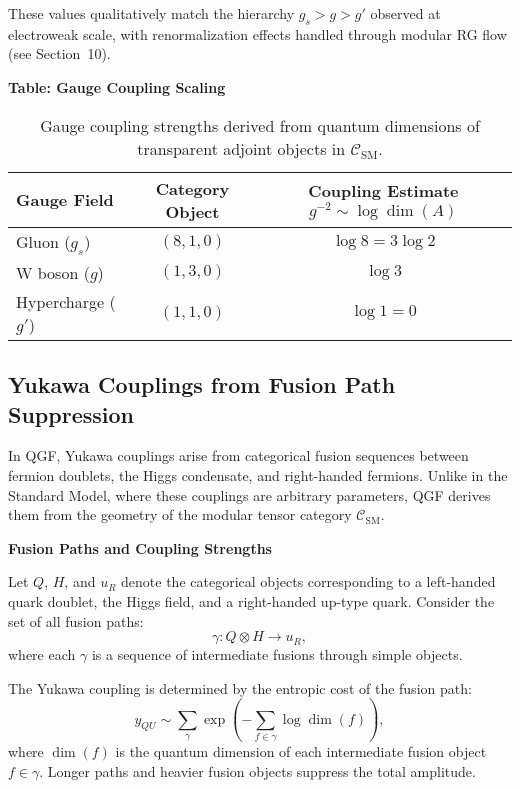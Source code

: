\documentclass[11pt]{article}
\def\left{}
\def\right{}
\begin{document}
These values qualitatively match the hierarchy \( g_s > g > g' \) observed at electroweak scale, with renormalization effects handled through modular RG flow (see Section~10).

\vspace{0.5em}
\noindent\textbf{Table: Gauge Coupling Scaling}

\begin{table}[H]
\centering
\renewcommand{\arraystretch}{1.2}
\begin{tabular}{|l|c|c|}
\hline
\textbf{Gauge Field} & \textbf{Category Object} & \textbf{Coupling Estimate \( g^{-2} \sim \log \dim(A) \)} \\
\hline
Gluon (\( g_s \)) & \( (8,1,0) \) & \( \log 8 = 3\log 2 \) \\
W boson (\( g \)) & \( (1,3,0) \) & \( \log 3 \) \\
Hypercharge (\( g' \)) & \( (1,1,0) \) & \( \log 1 = 0 \) \\
\hline
\end{tabular}
\caption{Gauge coupling strengths derived from quantum dimensions of transparent adjoint objects in \( \mathcal{C}_{\text{SM}} \).}
\label{tab:gauge-couplings}
\end{table}



\subsection{Yukawa Couplings from Fusion Path Suppression}

In QGF, Yukawa couplings arise from categorical fusion sequences between fermion doublets, the Higgs condensate, and right-handed fermions. Unlike in the Standard Model, where these couplings are arbitrary parameters, QGF derives them from the geometry of the modular tensor category \( \mathcal{C}_{\text{SM}} \).

\vspace{0.5em}
\noindent\textbf{Fusion Paths and Coupling Strengths}

Let \( Q \), \( H \), and \( u_R \) denote the categorical objects corresponding to a left-handed quark doublet, the Higgs field, and a right-handed up-type quark. Consider the set of all fusion paths:
\[
\gamma: Q \otimes H \rightarrow u_R,
\]
where each \( \gamma \) is a sequence of intermediate fusions through simple objects.

The Yukawa coupling is determined by the entropic cost of the fusion path:
\[
y_{QU} \sim \sum_{\gamma} \exp\left(-\sum_{f \in \gamma} \log \dim(f)\right),
\]
where \( \dim(f) \) is the quantum dimension of each intermediate fusion object \( f \in \gamma \). Longer paths and heavier fusion objects suppress the total amplitude.
\end{document}
